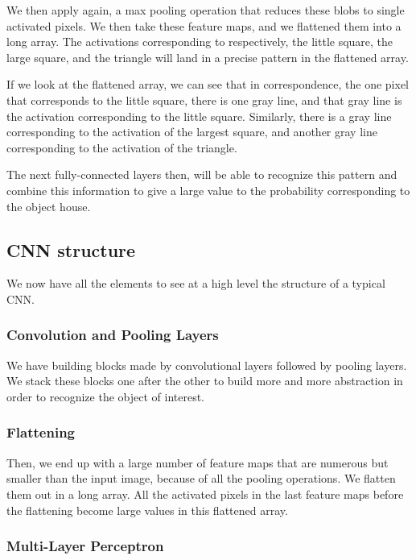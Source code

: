 We then apply again, a max pooling operation that reduces these blobs to single activated pixels. We then take these feature maps, and we flattened them into a long array. The activations corresponding to respectively, the little square, the large square, and the triangle will land in a precise pattern in the flattened array. \newline

If we look at the flattened array, we can see that in correspondence, the one pixel that corresponds to the little square, there is one gray line,
and that gray line is the activation corresponding to the little square. Similarly, there is a gray line corresponding to the activation of the largest square, and another gray line corresponding to the activation of the triangle. \newline

The next fully-connected layers then, will be able to recognize this pattern and combine this information to give a large value to the probability corresponding to the object house.

\subsection{CNN structure}

We now have all the elements to see at a high level the structure of a typical CNN.

\subsubsection{Convolution and Pooling Layers}

We have building blocks made by convolutional layers followed by pooling layers. We stack these blocks one after the other to build more and more abstraction in order to recognize the object of interest.

\subsubsection{Flattening}

Then, we end up with a large number of feature maps that are numerous but smaller than the input image, because of all the pooling operations. We flatten them out in a long array. All the activated pixels in the last feature maps before the flattening become large values in this flattened array.

\subsubsection{Multi-Layer Perceptron}

